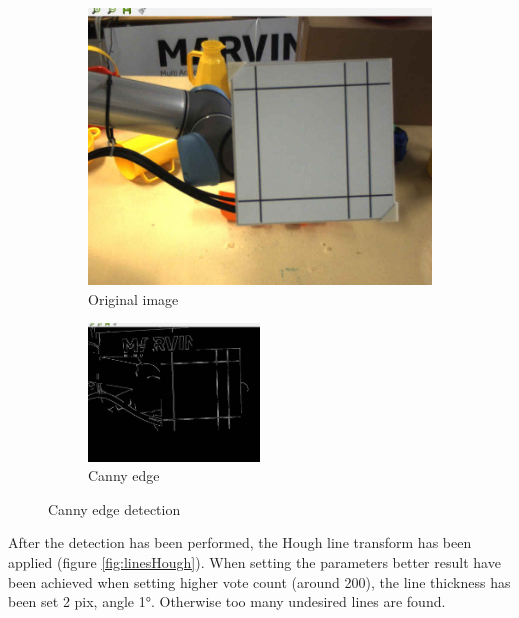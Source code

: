 \begin{figure}[ht!]
	\begin{subfigure}{.49\textwidth}
		\centering
		\includegraphics[width=\textwidth]{figures/lines1}
	\caption{Original image}
	\label{fig:l1}
	\end{subfigure}
	\begin{subfigure}{\textwidth}
		\centering
\includegraphics[width=0.5\textwidth]{figures/lines2}
	\caption{Canny edge}
	\label{fig:l2}
	\end{subfigure}
\caption{Canny edge detection}
\label{fig:linesCanny}
\end{figure}

After the detection has been performed, the Hough line transform has been applied (figure \ref{fig:linesHough}). When setting the parameters better result have been achieved when setting higher vote count (around 200), the line thickness has been set 2 pix, angle 1°. Otherwise too many undesired lines are found.

